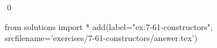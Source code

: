 
\begin{ex}
  \label{ex:7-61-constructors}
  
  \qed
\end{ex}
\begin{python0}
from solutions import *
add(label="ex:7-61-constructors",
    srcfilename='exercises/7-61-constructors/answer.tex')
\end{python0}
